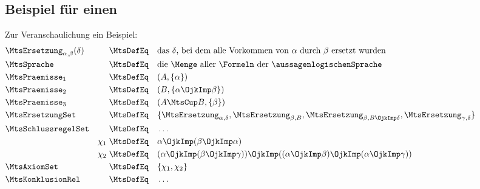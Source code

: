 \subsection[Beispiel für einen Beweis]{Beispiel für einen \Beweis}%
\label {sub:Beispielbeweis}



Zur Veranschaulichung ein Beispiel:
\begin{align}
	& \MtsErsetzung_{\alpha,\beta}(\delta) & \MtsDefEq \quad & \text{das }\delta \text{, bei dem alle Vorkommen von $\alpha$ durch $\beta$ ersetzt wurden} \\
	& \MtsSprache & \MtsDefEq \quad & \text{die \Menge\ aller \Formeln\ der \aussagenlogischenSprache} \\
	& \MtsPraemisse_1    & \MtsDefEq \quad & (A, \{\alpha\}) \\
	& \MtsPraemisse_2    & \MtsDefEq \quad & (B, \{\alpha \OjkImp \beta\}) \\
	& \MtsPraemisse_3    & \MtsDefEq \quad & (A \MtsCup B, \{\beta\}) \\
	& \MtsErsetzungSet   & \MtsDefEq \quad & \{\MtsErsetzung_{\alpha,\delta}, \MtsErsetzung_{\beta,B}, \MtsErsetzung_{\beta,B\OjkImp \delta}, \MtsErsetzung_{\gamma,\delta} \} \\
	& \MtsSchlussregelSet & \MtsDefEq \quad & \dots \\
	&          & \chi_1 \; \MtsDefEq \quad & \alpha \OjkImp (\beta \OjkImp \alpha) \\
	&          & \chi_2 \; \MtsDefEq \quad & (\alpha \OjkImp (\beta \OjkImp \gamma)) \OjkImp ((\alpha \OjkImp \beta) \OjkImp (\alpha \OjkImp \gamma)) \\
	& \MtsAxiomSet          & \MtsDefEq \quad & \{\chi_1, \chi_2\} \\
	& \MtsKonklusionRel     & \MtsDefEq \quad & \dots
	\formulatoleft
\end{align}

\subsection[Beweisschritte]{\Beweisschritte}%
\label {sub:Beweisschritte}


